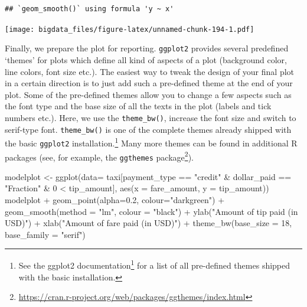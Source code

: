 \documentclass[
  12pt,
]{style/krantz}
\newenvironment{Shaded}{\begin{snugshade}}{\end{snugshade}}
\newcommand{\AttributeTok}[1]{\textcolor[rgb]{0.77,0.63,0.00}{#1}}
\newcommand{\DecValTok}[1]{\textcolor[rgb]{0.00,0.00,0.81}{#1}}
\newcommand{\FloatTok}[1]{\textcolor[rgb]{0.00,0.00,0.81}{#1}}
\newcommand{\FunctionTok}[1]{\textcolor[rgb]{0.00,0.00,0.00}{#1}}
\newcommand{\NormalTok}[1]{#1}
\newcommand{\OtherTok}[1]{\textcolor[rgb]{0.56,0.35,0.01}{#1}}
\newcommand{\SpecialCharTok}[1]{\textcolor[rgb]{0.00,0.00,0.00}{#1}}
\newcommand{\StringTok}[1]{\textcolor[rgb]{0.31,0.60,0.02}{#1}}
\renewcommand{\href}[2]{#2\footnote{\url{#1}}}
\begin{document}
\begin{verbatim}
## `geom_smooth()` using formula 'y ~ x'
\end{verbatim}

\texttt{[image: bigdata\_files/figure-latex/unnamed-chunk-194-1.pdf]}

Finally, we prepare the plot for reporting. \texttt{ggplot2} provides several predefined `themes' for plots which define all kind of aspects of a plot (background color, line colors, font size etc.). The easiest way to tweak the design of your final plot in a certain direction is to just add such a pre-defined theme at the end of your plot. Some of the pre-defined themes allow you to change a few aspects such as the font type and the base size of all the texts in the plot (labels and tick numbers etc.). Here, we use the \texttt{theme\_bw()}, increase the font size and switch to serif-type font. \texttt{theme\_bw()} is one of the complete themes already shipped with the basic \texttt{ggplot2} installation.\footnote{See \href{https://ggplot2.tidyverse.org/reference/ggtheme.html}{the ggplot2 documentation} for a list of all pre-defined themes shipped with the basic installation.} Many more themes can be found in additional R packages (see, for example, the \href{https://cran.r-project.org/web/packages/ggthemes/index.html}{\texttt{ggthemes} package}).

\begin{Shaded}
\begin{Highlighting}[]
\NormalTok{modelplot }\OtherTok{\textless{}{-}} \FunctionTok{ggplot}\NormalTok{(}\AttributeTok{data=}\NormalTok{ taxi[payment\_type }\SpecialCharTok{==} \StringTok{"credit"} \SpecialCharTok{\&}\NormalTok{ dollar\_paid }\SpecialCharTok{==} \StringTok{"Fraction"} \SpecialCharTok{\&} \DecValTok{0} \SpecialCharTok{\textless{}}\NormalTok{ tip\_amount],}
                    \FunctionTok{aes}\NormalTok{(}\AttributeTok{x =}\NormalTok{ fare\_amount, }\AttributeTok{y =}\NormalTok{ tip\_amount))}
\NormalTok{modelplot }\SpecialCharTok{+}
     \FunctionTok{geom\_point}\NormalTok{(}\AttributeTok{alpha=}\FloatTok{0.2}\NormalTok{, }\AttributeTok{colour=}\StringTok{"darkgreen"}\NormalTok{) }\SpecialCharTok{+}
     \FunctionTok{geom\_smooth}\NormalTok{(}\AttributeTok{method =} \StringTok{"lm"}\NormalTok{, }\AttributeTok{colour =} \StringTok{"black"}\NormalTok{) }\SpecialCharTok{+}
     \FunctionTok{ylab}\NormalTok{(}\StringTok{"Amount of tip paid (in USD)"}\NormalTok{) }\SpecialCharTok{+}
     \FunctionTok{xlab}\NormalTok{(}\StringTok{"Amount of fare paid (in USD)"}\NormalTok{) }\SpecialCharTok{+}
     \FunctionTok{theme\_bw}\NormalTok{(}\AttributeTok{base\_size =} \DecValTok{18}\NormalTok{, }\AttributeTok{base\_family =} \StringTok{"serif"}\NormalTok{)}
\end{Highlighting}
\end{Shaded}
\end{document}
